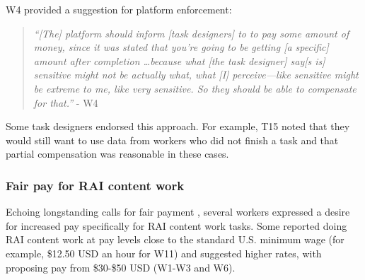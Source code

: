  W4 provided a suggestion for platform enforcement:
\begin{quote}
    \textit{``[The] platform should inform [task designers] to to pay some amount of money, since it was stated that you're going to be getting [a specific] amount after completion \dots because what [the task designer] say[s is] sensitive might not be actually what, what [I] perceive---like sensitive might be extreme to me, like very sensitive. So they should be able to compensate for that.''} - W4
\end{quote}
Some task designers endorsed this approach. For example, T15 noted that they would still want to use data from workers who did not finish a task and that partial compensation was reasonable in these cases. 

\subsubsection{Fair pay for RAI content work}
Echoing longstanding calls for fair payment , several workers expressed a desire for increased pay specifically for RAI content work tasks. 
 Some reported doing RAI content work at pay levels close to the standard U.S. minimum wage (for example, \$12.50 USD an hour for W11) and suggested higher rates, with proposing pay from \$30-\$50 USD (W1-W3 and W6). 

